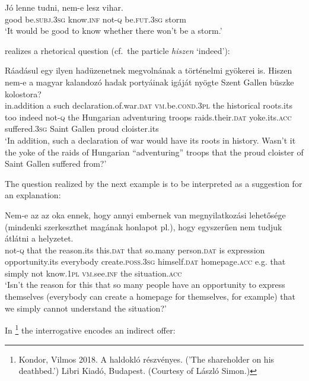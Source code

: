 \documentclass[output=paper,colorlinks,citecolor=brown]{langscibook}
\begin{document}
	\ea\label{ex:tudni}
	\gll Jó lenne tudni, nem-e lesz vihar. \\
	good be.\textsc{subj.3sg} know.\textsc{inf} not-\textsc{q}  be.\textsc{fut.3sg} storm\\
	\glt `It would be good to know whether there won't be a storm.'
	\z
	
	\noindent {} realizes a  rhetorical question (cf.~the particle \textit{hiszen} `indeed'):
	
	
	\ea\label{ex:stgallen}
	\gll
	Ráadásul egy ilyen hadüzenetnek megvolnának a történelmi gyökerei is. Hiszen nem-e a magyar kalandozó hadak portyáinak igáját nyögte Szent Gallen büszke kolostora?\\
	in.addition a such declaration.of.war.\textsc{dat} \textsc{vm}.be.\textsc{cond.3pl} the historical roots.its too indeed not-\textsc{q} the Hungarian adventuring troops raids.their.\textsc{dat} yoke.its.\textsc{acc} suffered.\textsc{3sg} Saint Gallen proud cloister.its\\ \jambox*{[HNC]}
	\glt `In addition, such a declaration of war would have its roots in history. Wasn't it the yoke of the raids of Hungarian ``adventuring'' troops that the proud cloister of Saint Gallen suffered from?'
	\z
	
	\noindent The question realized by the next example is to be interpreted as a suggestion for an explanation:
	
	\ea\label{ex:honlap}
	\gll Nem-e az az oka ennek, hogy annyi embernek van megnyilatkozási lehetősége (mindenki szerkeszthet magának honlapot pl.), hogy egyszerűen nem tudjuk átlátni a helyzetet.\\
	not-\textsc{q} that the reason.its this.\textsc{dat} that so.many person.\textsc{dat} is expression opportunity.its \hspace{0.15cm}everybody create.\textsc{poss.3sg} himself.\textsc{dat} homepage.\textsc{acc} e.g. that simply not know.\textsc{1pl} \textsc{vm.}see.\textsc{inf} the situation.\textsc{acc}\\ \jambox*{[HNC]}
	\glt `Isn't the reason for this  that so many people have an opportunity to express themselves (everybody can create a homepage for themselves, for example) that we simply cannot understand the situation?'
	\z
	
	
	\noindent In \footnote{Kondor, Vilmos 2018. A haldokló részvényes. ('The shareholder on his deathbed.') Libri Kiadó, Budapest. (Courtesy of László Simon.)} the interrogative  encodes an  indirect offer:
	
\end{document}
